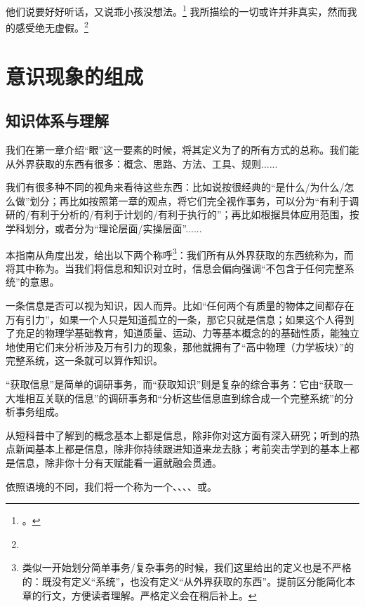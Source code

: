 \begin{savequote}[250pt]
    \fontsize{8pt}{12pt}\selectfont\fontsize{8pt}{12pt}
    他们说要好好听话，又说乖小孩没想法。\footnote{\another{}。}
    我所描绘的一切或许并非真实，然而我的感受绝无虚假。\footnote{}	
\end{savequote}
\chapter{意识现象的组成} %

\section{知识体系与理解}

我们在第一章介绍“眼”这一要素的时候，将其定义为了的所有方式的总称。我们能从外界获取的东西有很多：概念、思路、方法、工具、规则......
\begin{examples}
我们有很多种不同的视角来看待这些东西：比如说按很经典的“是什么/为什么/怎么做”划分；再比如按照第一章的观点，将它们完全视作事务，可以分为“有利于调研的/有利于分析的/有利于计划的/有利于执行的”；再比如根据具体应用范围，按学科划分，或者分为“理论层面/实操层面”......
\end{examples}

本指南从角度出发，给出以下两个称呼\footnote{类似一开始划分简单事务/复杂事务的时候，我们这里给出的定义也是不严格的：既没有定义“系统”，也没有定义“从外界获取的东西”。提前区分能简化本章的行文，方便读者理解。严格定义会在稍后补上。}：我们所有从外界获取的东西统称为，而将其中称为。当我们将信息和知识对立时，信息会偏向强调“不包含于任何完整系统”的意思。
\begin{examples}
一条信息是否可以视为知识，因人而异。比如“任何两个有质量的物体之间都存在万有引力”，如果一个人只是知道孤立的一条，那它只就是信息；如果这个人得到了充足的物理学基础教育，知道质量、运动、力等基本概念的的基础性质，能独立地使用它们来分析涉及万有引力的现象，那他就拥有了“高中物理（力学板块）”的完整系统，这一条就可以算作知识。
\end{examples}
“获取信息”是简单的调研事务，而“获取知识”则是复杂的综合事务：它由“获取一大堆相互关联的信息”的调研事务和“分析这些信息直到综合成一个完整系统”的分析事务组成。
\begin{examples}
从短科普中了解到的概念基本上都是信息，除非你对这方面有深入研究；听到的热点新闻基本上都是信息，除非你持续跟进知道来龙去脉；考前突击学到的基本上都是信息，除非你十分有天赋能看一遍就融会贯通。
\end{examples}
依照语境的不同，我们将一个称为一个、、、、或。

